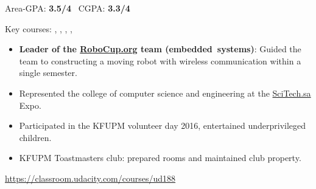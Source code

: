 

{}
\smallskip
Area-GPA: \textbf{3.5/4} \ CGPA: \textbf{3.3/4} \\
\smallskip
\begin{small}
    Key courses: , , , , 
\end{small}

\smallskip
\begin{itemize}
    \item \textbf{Leader of the \href{https://www.robocup.org/}{RoboCup.org} team (embedded~systems)}: Guided the team to constructing a moving robot with wireless communication within a single semester.
    \item Represented the college of computer science and engineering at the \href{https://www.scitech.sa}{SciTech.sa} Expo.
    \item Participated in the KFUPM volunteer day 2016, entertained underprivileged children.
    \item KFUPM Toastmasters club: prepared rooms and maintained club property.
\end{itemize}



\divider

\href{https://classroom.udacity.com/courses/ud188}{https://classroom.udacity.com/courses/ud188}

